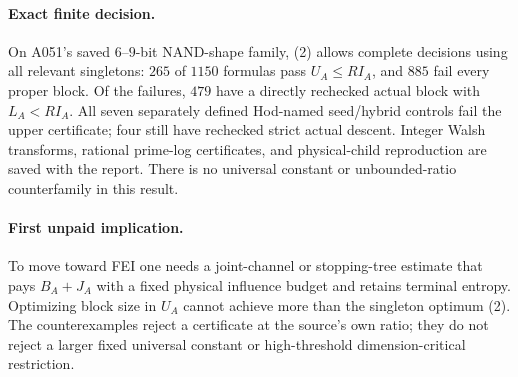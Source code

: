\documentclass{article}
\begin{document}
\paragraph{Exact finite decision.}
On A051's saved $6$--$9$-bit NAND-shape family, (2) allows complete
decisions using all relevant singletons: $265$ of $1150$ formulas pass
$U_A\le R I_A$, and $885$ fail every proper block. Of the failures, $479$
have a directly rechecked actual block with $L_A<R I_A$. All seven
separately defined Hod-named seed/hybrid controls fail the upper
certificate; four still have rechecked strict actual descent. Integer
Walsh transforms, rational prime-log certificates, and physical-child
reproduction are saved with the report. There is no universal constant
or unbounded-ratio counterfamily in this result.

\paragraph{First unpaid implication.}
To move toward FEI one needs a joint-channel or stopping-tree estimate
that pays $B_A+J_A$ with a fixed physical influence budget and retains
terminal entropy. Optimizing block size in $U_A$ cannot achieve more than
the singleton optimum (2). The counterexamples reject a certificate at
the source's own ratio; they do not reject a larger fixed universal
constant or high-threshold dimension-critical restriction.
\end{document}
